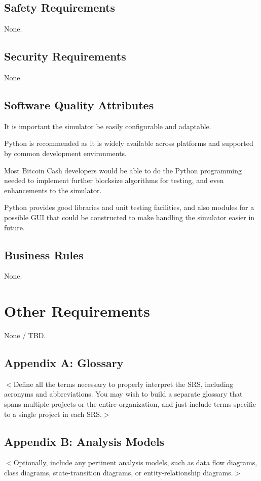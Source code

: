 \documentclass{scrreprt}
\begin{document}
\section{Safety Requirements}
None.

\section{Security Requirements}
None.

\section{Software Quality Attributes}
It is important the simulator be easily configurable and adaptable.

Python is recommended as it is widely available across platforms and supported
by common development environments.

Most Bitcoin Cash developers would be able to do the Python programming needed
to implement further blocksize algorithms for testing, and even enhancements
to the simulator.

Python provides good libraries and unit testing facilities, and also modules
for a possible GUI that could be constructed to make handling the simulator
easier in future.


\section{Business Rules}
None.


\chapter{Other Requirements}
None / TBD.

\section{Appendix A: Glossary}
$<$Define all the terms necessary to properly interpret the SRS, including
acronyms and abbreviations. You may wish to build a separate glossary that spans
multiple projects or the entire organization, and just include terms specific to
a single project in each SRS.$>$

\section{Appendix B: Analysis Models}
$<$Optionally, include any pertinent analysis models, such as data flow
diagrams, class diagrams, state-transition diagrams, or entity-relationship
diagrams.$>$
\end{document}
